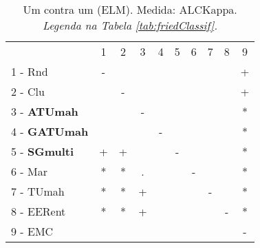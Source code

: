 \begin{table}[h]
\caption{Um contra um (ELM). Medida: ALCKappa. \textit{Legenda na Tabela \ref{tab:friedClassif}.}}
\begin{center}\begin{tabular}{lcc|cc|cc|cc|c}
 			& 1 & 2 & 3 & 4 & 5 & 6 & 7 & 8 & 9\\
1 - Rnd  	& - &   &   &   &   &   &   &   & + \\
2 - Clu  	&   & - &   &   &   &   &   &   & + \\ \hline
3 - \textbf{ATUmah}	&   &   & - &   &   &   &   &   & * \\
4 - \textbf{GATUmah}	&   &   &   & - &   &   &   &   & * \\ \hline
5 - \textbf{SGmulti}	& + & + &   &   & - &   &   &   & * \\
6 - Mar  	& * & * & . &   &   & - &   &   & * \\ \hline
7 - TUmah	& * & * & + &   &   &   & - &   & * \\
8 - EERent	& * & * & + &   &   &   &   & - & * \\ \hline
9 - EMC  	&   &   &   &   &   &   &   &   & - \\\end{tabular}
\quad

\label{stratsALCKappaFriedELMRedux}
\end{center}
\end{table}
